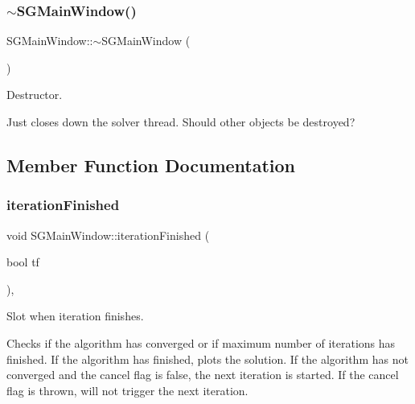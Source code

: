 \subsubsection{\texorpdfstring{$\sim$\+S\+G\+Main\+Window()}{~SGMainWindow()}}
{\footnotesize\ttfamily S\+G\+Main\+Window\+::$\sim$\+S\+G\+Main\+Window (\begin{DoxyParamCaption}{ }\end{DoxyParamCaption})\hspace{0.3cm}{\ttfamily [inline]}}



Destructor. 

Just closes down the solver thread. Should other objects be destroyed? 

\subsection{Member Function Documentation}
\mbox{\label{classSGMainWindow_a511aee91c2c031f7f4a9148073177f0e}} 
\subsubsection{\texorpdfstring{iteration\+Finished}{iterationFinished}}
{\footnotesize\ttfamily void S\+G\+Main\+Window\+::iteration\+Finished (\begin{DoxyParamCaption}\item[{bool}]{tf }\end{DoxyParamCaption})\hspace{0.3cm}{\ttfamily [private]}, {\ttfamily [slot]}}



Slot when iteration finishes. 

Checks if the algorithm has converged or if maximum number of iterations has finished. If the algorithm has finished, plots the solution. If the algorithm has not converged and the cancel flag is false, the next iteration is started. If the cancel flag is thrown, will not trigger the next iteration. \mbox{\label{classSGMainWindow_a59248c811344a260981ea270d86d5d19}} 
